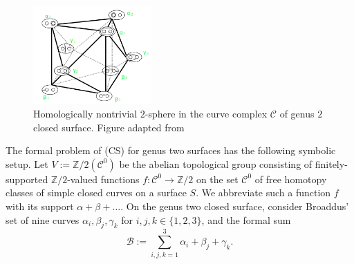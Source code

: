 \documentclass[12pt]{amsart}
\theoremstyle{definition}
\theoremstyle{remark}
\newcommand{\bZ}{\mathbb{Z}}
\newcommand{\sB}{\mathscr{B}}
\newcommand{\sC}{\mathscr{C}}
\begin{document}
\begin{figure}\label{br}
\centering
\includegraphics[width=0.4\textwidth]{broaddus-sphere-marked-new.png}
\caption{Homologically nontrivial $2$-sphere in the curve complex $\sC$ of genus $2$ closed surface. Figure adapted from \cite[Fig.10]{Broaddus2012}}
\end{figure}



The formal problem of (CS) for genus two surfaces has the following symbolic setup. Let $V:=\bZ/2(\sC^0)$ be the abelian topological group consisting of finitely-supported $\bZ/2$-valued functions $f: \sC^0 \to \bZ/2$ on the set $\sC^0$ of free homotopy classes of simple closed curves on a surface $S$. We abbreviate such a function $f$ with its support $\alpha+\beta+\ldots$. On the genus two closed surface, consider Broaddus' set of nine curves $\alpha_i, \beta_j, \gamma_k$ for $i,j,k \in \{1,2,3\}$, and the formal sum 
\begin{equation}\label{bb}
\sB:= \sum_{i,j,k=1}^{3} \alpha_i+\beta_j+\gamma_k.
\end{equation}
\end{document}

